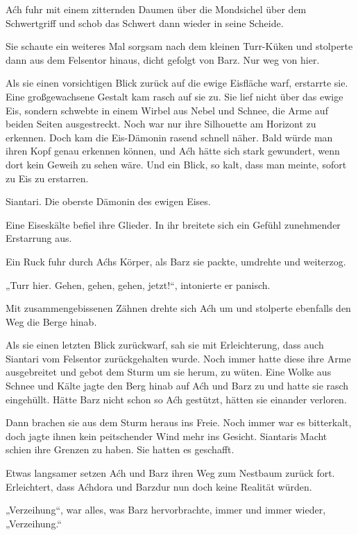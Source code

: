 Aćh fuhr mit einem zitternden Daumen über die Mondsichel über dem Schwertgriff und schob das Schwert dann wieder in seine Scheide.

Sie schaute ein weiteres Mal sorgsam nach dem kleinen Turr-Küken und stolperte dann aus dem Felsentor hinaus, dicht gefolgt von Barz. Nur weg von hier.

Als sie einen vorsichtigen Blick zurück auf die ewige Eisfläche warf, erstarrte sie. Eine großgewachsene Gestalt kam rasch auf sie zu. Sie lief nicht über das ewige Eis, sondern schwebte in einem Wirbel aus Nebel und Schnee, die Arme auf beiden Seiten ausgestreckt. Noch war nur ihre Silhouette am Horizont zu erkennen. Doch kam die Eis-Dämonin rasend schnell näher. Bald würde man ihren Kopf genau erkennen können, und Aćh hätte sich stark gewundert, wenn dort kein Geweih zu sehen wäre. Und ein Blick, so kalt, dass man meinte, sofort zu Eis zu erstarren.

Siantari. Die oberste Dämonin des ewigen Eises.

Eine Eiseskälte befiel ihre Glieder. In ihr breitete sich ein Gefühl zunehmender Erstarrung aus.

Ein Ruck fuhr durch Aćhs Körper, als Barz sie packte, umdrehte und weiterzog.

„Turr hier. Gehen, gehen, gehen, jetzt!“, intonierte er panisch.

Mit zusammengebissenen Zähnen drehte sich Aćh um und stolperte ebenfalls den Weg die Berge hinab.

Als sie einen letzten Blick zurückwarf, sah sie mit Erleichterung, dass auch Siantari vom Felsentor zurückgehalten wurde. Noch immer hatte diese ihre Arme ausgebreitet und gebot dem Sturm um sie herum, zu wüten. Eine Wolke aus Schnee und Kälte jagte den Berg hinab auf Aćh und Barz zu und hatte sie rasch eingehüllt. Hätte Barz nicht schon so Aćh gestützt, hätten sie einander verloren.

Dann brachen sie aus dem Sturm heraus ins Freie. Noch immer war es bitterkalt, doch jagte ihnen kein peitschender Wind mehr ins Gesicht. Siantaris Macht schien ihre Grenzen zu haben. Sie hatten es geschafft.\bigskip







Etwas langsamer setzen Aćh und Barz ihren Weg zum Nestbaum zurück fort. Erleichtert, dass Aćhdora und Barzdur nun doch keine Realität würden.

„Verzeihung“, war alles, was Barz hervorbrachte, immer und immer wieder, „Verzeihung.“

